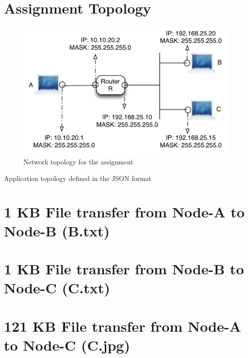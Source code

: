 \documentclass{scrartcl}
\begin{document}
\section{Assignment Topology} \label{appendix:topology}
\begin{figure}[H]
\centering
\includegraphics[scale=.65]{topology.png}
\caption{Network topology for the assignment}
\label{fig:topo}
\end{figure}
\bigskip

\centering\small{Application topology defined in the JSON format}
\newpage
\section{1 KB File transfer from Node-A to Node-B (B.txt)} \label{appendix:runfirst}

\newpage
\section{1 KB File transfer from Node-B to Node-C (C.txt)}

\newpage
\section{121 KB File transfer from Node-A to Node-C (C.jpg)}

\newpage
\end{document}

